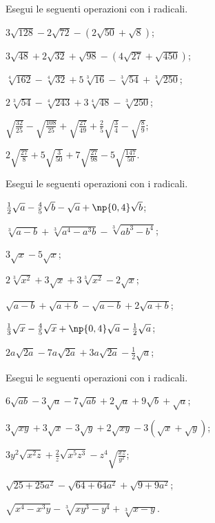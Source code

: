 \begin{esercizio}[\Ast]
 \label{ese:2.65}
Esegui le seguenti operazioni con i radicali.
 \begin{multicols}{2}
 \begin{enumeratea}
 \item $3\sqrt{128}-2\sqrt{72}-(2\sqrt{50}+\sqrt 8)$;
 \item $3\sqrt{48}+2\sqrt{32}+\sqrt{98}-(4\sqrt{27}+\sqrt{450})$;
 \item $\sqrt[4]{162}-\sqrt[4]{32}+5\sqrt[3]{16}-\sqrt[3]{54}+\sqrt[3]{250}$;
 \item $2\sqrt[3]{54}-\sqrt[4]{243}+3\sqrt[4]{48}-\sqrt[3]{250}$;
 \item $\sqrt{\frac{32}{25}}-\sqrt{\frac{108}{25}}+\sqrt{\frac{27}{49}}+\frac 2 5\sqrt{\frac 3 4}-\sqrt{\frac 8 9}$;
 \item $2\sqrt{\frac{27} 8}+5\sqrt{\frac 3{50}}+7\sqrt{\frac{27}{98}}-5\sqrt{\frac{147}{50}}$.
 \end{enumeratea}
 \end{multicols}
\end{esercizio}

\begin{esercizio}[\Ast]
 \label{ese:2.66}
Esegui le seguenti operazioni con i radicali.
 \begin{multicols}{2}
 \begin{enumeratea}
 \item $\frac 1 2\sqrt a-\frac 4 5\sqrt b-\sqrt a+\np{0,4}\sqrt b$;
 \item $\sqrt[3]{a-b}+\sqrt[3]{a^4-a^3b}-\sqrt[3]{{ab}^3-b^4}$;
 \item $3\sqrt x-5\sqrt x$;
 \item $2\sqrt[3]{x^2}+3\sqrt x+3\sqrt[3]{x^2}-2\sqrt x$;
 \item $\sqrt{a-b}+\sqrt{a+b}-\sqrt{a-b}+2\sqrt{a+b}$;
 \item $\frac 1 3\sqrt x-\frac 4 5\sqrt x+\np{0,4}\sqrt a-\frac 1 2\sqrt a$;
 \item $2a\sqrt{2a}-7a\sqrt{2a}+3a\sqrt{2a}-\frac 1 2\sqrt a$;
 \end{enumeratea}
 \end{multicols}
\end{esercizio}

\begin{esercizio}[\Ast]
 \label{ese:2.67}
Esegui le seguenti operazioni con i radicali.
 \begin{enumeratea}
 \item $6\sqrt{{ab}}-3\sqrt a-7\sqrt{{ab}}+2\sqrt a+9\sqrt b+\sqrt a$;
 \item $3\sqrt{xy}+3\sqrt x-3\sqrt y+2\sqrt{xy}-3(\sqrt x+\sqrt y)$;
 \item $3y^{2}\sqrt{x^{2}z}+\frac{2}{z}\sqrt{x^{5}z^{3}}-z^{4}\sqrt{\frac{xz}{y^{2}}}$;
 \item $\sqrt{25+25a^{2}}-\sqrt{64+64a^{2}}+\sqrt{9+9a^{2}}$;
 \item $\sqrt{x^{4}-x^{3}y}-\sqrt[3]{xy^{3}-y^{4}}+\sqrt[3]{x-y}$.
 \end{enumeratea}
\end{esercizio}

